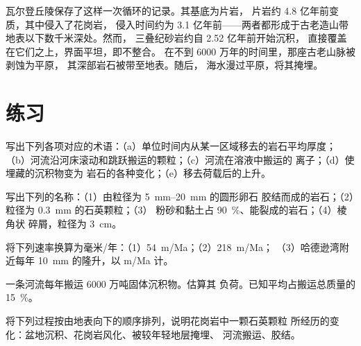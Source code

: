瓦尔登丘陵保存了这样一次循环的记录。其基底为片岩，
片岩约 4.8 亿年前变质，其中侵入了花岗岩，
侵入时间约为 3.1 亿年前——两者都形成于古老造山带地表以下数千米深处。然而，
三叠纪砂岩约自 2.52 亿年前开始沉积，
直接覆盖在它们之上，界面平坦，即不整合。
在不到 6000 万年的时间里，那座古老山脉被剥蚀为平原，
其深部岩石被带至地表。随后，
海水漫过平原，将其掩埋。

\section{练习}

\begin{exercise}[$\star$]\label{exo:g12:destruction-of-mountains:1}
写出下列各项对应的术语：（a）单位时间内从某一区域移去的岩石平均厚度；
（b）河流沿河床滚动和跳跃搬运的颗粒；（c）河流在溶液中搬运的
离子；（d）使埋藏的沉积物变为
岩石的各种变化；（e）移去荷载后的上升。
\end{exercise}

\begin{exercise}[$\star$]\label{exo:g12:destruction-of-mountains:2}
写出下列的名称：（1）由粒径为 \qtyrange{5}{20}{mm} 的圆形卵石
胶结而成的岩石；（2）粒径为 \qty{0.3}{mm} 的石英颗粒；（3）
粉砂和黏土占 \qty{90}{\percent}、能裂成的岩石；（4）棱角状
碎屑，粒径为 \qty{3}{cm}。
\end{exercise}

\begin{exercise}[$\star$]\label{exo:g12:destruction-of-mountains:3}
将下列速率换算为毫米/年：（1）\qty{54}{m/Ma}；（2）\qty{218}{m/Ma}；
（3）哈德逊湾附近每年 \qty{10}{mm} 的隆升，以 \unit{m/Ma} 计。
\end{exercise}

\begin{exercise}[$\star$]\label{exo:g12:destruction-of-mountains:4}
一条河流每年搬运 6000 万吨固体沉积物。估算其
负荷。已知平均占搬运总质量的
\qty{15}{\percent}。
\end{exercise}

\begin{exercise}[$\star$]\label{exo:g12:destruction-of-mountains:5}
将下列过程按由地表向下的顺序排列，说明花岗岩中一颗石英颗粒
所经历的变化：盆地沉积、花岗岩风化、被较年轻地层掩埋、
河流搬运、胶结。
\end{exercise}


